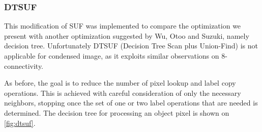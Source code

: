 \documentclass[hidelinks]{llncs}
\newcommand{\texten}[1]{#1}
\newcommand{\textru}[1]{}
\begin{document}
\subsubsection{DTSUF}

\texten{
This modification of SUF was implemented to compare the optimization we present with
another optimization suggested by Wu, Otoo and Suzuki\cite{wuotoo},
namely decision tree.
Unfortunately DTSUF (Decision Tree Scan plus Union-Find) is not
applicable for condensed image, as it exploits similar observations on 8-connectivity.
}\textru{
Эта модификация SUF была добавлена чтобы сравнить нашу оптимизацию с
одной из оптимизаций, предложенных Wu, Otoo и Suzuki\cite{wuotoo}, а именно с
деревом принятия решения.
К сожалению, DTSUF (Decision Tree Scan with Union-Find) не применим для сжатого
изображения, так как использует свойства 8-связности, которыми наша новая
связность не обладает.
}

\texten{
As before, the goal is to reduce the number of pixel lookup and label copy operations.
This is achieved with careful consideration of only the necessary neighbors,
stopping once the set of one or two label operations that are needed is
determined. The decision tree for processing an object pixel is
shown on \autoref{fig:dtsuf}.
}\textru{
Как и раньше, цель состоит в том, чтобы уменьшить число запросов на содержание
пикселя и копирований меток.
Это достигается аккуратным рассмотрением соседей в оптимальном порядке и
остановкой рассмотрения, как только достаточная для выполнения всех необоходимых
действий информация была получена.
Смотри дерево на \autoref{fig:dtsuf}.
}
\end{document}
